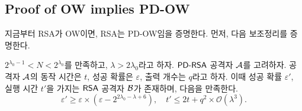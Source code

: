 
\subsection{Proof of OW implies PD-OW}

지금부터 RSA가 OW이면, RSA는 PD-OW임을 증명한다. 먼저, 다음 보조정리를 증명한다.

\begin{tcolorbox}[colback=white, sharp corners, boxrule=0.7pt]
    \begin{lemma}
        $2^{\lambda_0 - 1} < N < 2^{\lambda_0}$를 만족하고, $\lambda >
        2\lambda_0$라고 하자. $\textsf{PD-RSA}$ 공격자 $\mathcal{A}$를 고려하자. 공격자 $\mathcal{A}$의
        동작 시간은 $t$, 성공 확률은 $\varepsilon$, 출력 개수는 $q$라고 하자.
        이때 성공 확률 $\varepsilon'$, 실행 시간 $t'$을 가지는 $\textsf{RSA}$ 공격자
        $\mathcal{B}$가 존재하며, 다음을 만족한다.
        $$
            \varepsilon' \geq \varepsilon \times (\varepsilon - 2^{2\lambda_0 - \lambda + 6}), 
            \quad t' \leq 2t + q^2 \times \mathcal{O}(\lambda^3).
        $$
    \end{lemma}
\end{tcolorbox}

